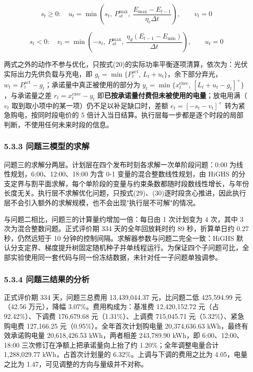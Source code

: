 \documentclass[12pt,a4paper]{ctexart}
\begin{document}
\begin{equation}
s_t\ge0:\quad u_t=\min\left(s_t,\ P_{st}^{\max},\ \frac{E_{\max}-E_{t-1}}{\eta_c\Delta t}\right),\qquad v_t=0
\end{equation}

\begin{equation}
s_t<0:\quad v_t=\min\left(-s_t,\ P_{st}^{\max},\ \frac{\eta_d\left(E_{t-1}-E_{\min}\right)}{\Delta t}\right),\qquad u_t=0
\end{equation}

两式之外的动作不参与优化，只按式(20)的实际功率平衡逐项清算，依次为：光伏实际出力先供负载与充电，即 $g_t=\min\{P_t^{\mathrm{act}},\,L_t+u_t\}$，余下部分弃光，$w_t=P_t^{\mathrm{act}}-g_t$；承诺量中真正被使用的部分为 $y_t=\min\{x_t^{\mathrm{exec}},\,[L_t+u_t-g_t]^{+}\}$，与承诺量之差 $r_t=x_t^{\mathrm{exec}}-y_t$ 即\textbf{已按承诺量付费但未被使用的电量}；放电用满（$v_t$ 取到取小项中的某一项）仍不足以补足缺口时，差额 $e_t=[-s_t-v_t]^{+}$ 转为紧急购电，按同时段电价的 5 倍计入当日结算。执行层每一步都是逐个时段的局部判断，不使用任何未来时段的信息。

\subsubsection*{5.3.3 问题三模型的求解}

问题三的求解分两层。计划层在四个发布时刻各求解一次单阶段问题：0:00 为线性规划，6:00、12:00、18:00 为含 0-1 变量的混合整数线性规划，由 HiGHS 的分支定界与割平面求解，每个单阶段的变量与约束条数都随时段数线性增长，与年份长度无关。执行层不求解优化问题，只按式(29)、(30)逐时段贪心推进，因此执行层不会引入额外的求解规模，也不会出现"执行层不可解"的情况。

与问题二相比，问题三的计算量约增加一倍：每日由 1 次计划变为 4 次，其中 3 次为混合整数问题。正式评价期 334 天的全年回放耗时约 89 秒，折算单日约 0.27 秒，仍然远短于 10 分钟的控制间隔。求解器参数与问题二完全一致：HiGHS 默认分支定界、梯度提升树固定随机种子并单线程运行。为保证四个子问题可比，全部实验使用同一套代码与同一份冻结数据，未针对任一子问题单独调参。

\subsubsection*{5.3.4 问题三结果的分析}

正式评价期 334 天，问题三总费用 13,439,044.37 元，比问题二低 425,594.99 元（42.56 万元），降幅 3.07\%。费用构成为：基准费 12,420,152.72 元（占 92.42\%）、下调费 176,679.68 元（1.31\%）、上调费 715,045.71 元（5.32\%）、紧急购电费 127,166.25 元（0.95\%）。全年首次计划购电量 20,374,636.63 kWh，最终有效承诺购电量 20,618,426.53 kWh，两者相差 243,789.90 kWh，即 6:00、12:00、18:00 三次修订在净额上把承诺量向上抬了约 1.20\%；全年调整电量合计 1,288,029.77 kWh，占首次计划量的 6.32\%。上调与下调的费用之比为 4.05，电量之比为 1.47，可见调整的方向与量级并不对称。
\end{document}
